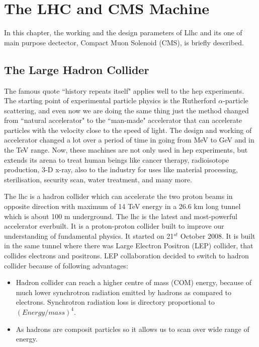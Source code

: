\chapter{The LHC and CMS Machine}
In this chapter, the working and the design parameters of L\acrfull{lhc} and its one of main purpose dectector, Compact Muon Solenoid (CMS), is briefly described.

\section{The Large Hadron Collider}
The famous quote ``history repeats itself" applies well to the \acrfull{hep} experiments. The starting point of experimental particle physics is the Rutherford $\alpha$-particle scattering, and even now we are doing the same thing just the method changed from ``natural accelerator" to the ``man-made" accelerator that can accelerate particles with the velocity close to the speed of light. The design and working of accelerator changed a lot over a period of time in going from MeV to GeV and in the TeV range. Now, these machines are not only used in \acrshort{hep} experiments, but extends its arena to treat human beings like cancer therapy, radioisotope production, 3-D x-ray, also to the industry for uses like material processing, sterilisation, security scan, water treatment, and many more. 

The \acrshort{lhc} is  a hadron collider which can accelerate the two proton beams in opposite direction with maximum of 14 TeV energy in a 26.6 km long tunnel which is about 100 m underground. The \acrshort{lhc} is the latest and most-powerful accelerator everbuilt. It is a proton-proton collider built to improve our understanding of fundamental physics. It started on 21$^{st}$ October 2008. It is built in the same tunnel where there was Large Electron Positron (LEP) collider, that collides electrons and positrons. LEP collaboration decided to switch to hadron collider because of following advantages:
\begin{itemize}
    \item Hadron collider can reach a higher centre of mass (COM) energy, because of much lower synchrotron radiation emitted by hadrons as compared to electrons. Synchrotron radiation loss is directory proportional to $(Energy/mass)^4$. 
    \item As hadrons are composit particles so it allows us to scan over wide range of energy.
\end{itemize}


